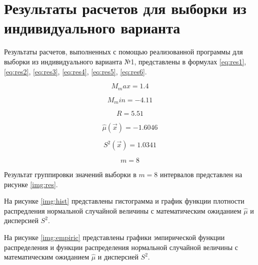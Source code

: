 \chapter{Результаты расчетов для выборки из индивидуального варианта}

Результаты расчетов, выполненных с помощью реализованной программы для выборки из индивидуального варианта №1, представлены в формулах \ref{eq:res1}, \ref{eq:res2}, \ref{eq:res3}, \ref{eq:res4}, \ref{eq:res5}, \ref{eq:res6}.

\begin{equation}\label{eq:res1}
	M_max = 1.4
\end{equation}

\begin{equation}\label{eq:res2}
	M_min = -4.11
\end{equation}

\begin{equation}\label{eq:res3}
	R = 5.51
\end{equation}

\begin{equation}\label{eq:res4}
	\hat{\mu}(\vec{x}) = -1.6046
\end{equation}

\begin{equation}\label{eq:res5}
	S^2(\vec{x}) = 1.0341
\end{equation}

\begin{equation}\label{eq:res6}
	m = 8
\end{equation}

Результат группировки значений выборки в $m = 8$ интервалов представлен на рисунке \ref{img:res}.


\clearpage

На рисунке \ref{img:hist} представлены гистограмма и график функции плотности распредления нормальной случайной величины с математическим ожиданием $\hat{\mu}$ и дисперсией $S^2$.


\clearpage

На рисунке \ref{img:empiric} представлены графики эмпирической функции распределения и функции распределения нормальной случайной величины с математическим ожиданием $\hat{\mu}$ и дисперсией $S^2$.

